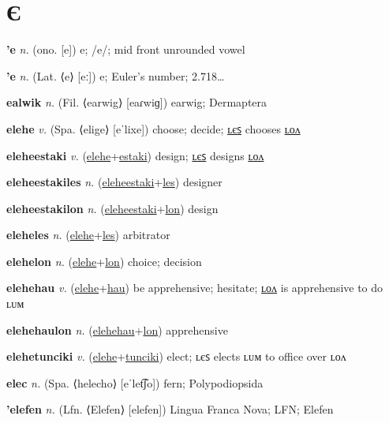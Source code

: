 \section{Є}

\textbf{\hypertarget{'e}{'e}} \textit{n.} (ono. [e])
e; /e/; mid front unrounded vowel

\textbf{\hypertarget{'e}{'e}} \textit{n.} (Lat. ⟨e⟩ [eː])
e; Euler’s number; 2.718…

\textbf{\hypertarget{ealwik}{ealwik}} \textit{n.} (Fil. ⟨earwig⟩ [eaɾwiɡ])
earwig; Dermaptera

\textbf{\hypertarget{elehe}{elehe}} \textit{v.} (Spa. ⟨elige⟩ [eˈlixe])
choose; decide; \hyperlink{eleheles}{ʟєꜱ} chooses \hyperlink{elehelon}{ʟᴏᴧ}

\textbf{\hypertarget{eleheestaki}{eleheestaki}} \textit{v.} (\hyperlink{elehe}{elehe}+\allowbreak \hyperlink{estaki}{estaki})
design; \hyperlink{eleheestakiles}{ʟєꜱ} designs \hyperlink{eleheestakilon}{ʟᴏᴧ}

\textbf{\hypertarget{eleheestakiles}{eleheestakiles}} \textit{n.} (\hyperlink{eleheestaki}{eleheestaki}+\allowbreak \hyperlink{les}{les})
designer

\textbf{\hypertarget{eleheestakilon}{eleheestakilon}} \textit{n.} (\hyperlink{eleheestaki}{eleheestaki}+\allowbreak \hyperlink{lon}{lon})
design

\textbf{\hypertarget{eleheles}{eleheles}} \textit{n.} (\hyperlink{elehe}{elehe}+\allowbreak \hyperlink{les}{les})
arbitrator

\textbf{\hypertarget{elehelon}{elehelon}} \textit{n.} (\hyperlink{elehe}{elehe}+\allowbreak \hyperlink{lon}{lon})
choice; decision

\textbf{\hypertarget{elehehau}{elehehau}} \textit{v.} (\hyperlink{elehe}{elehe}+\allowbreak \hyperlink{hau}{hau})
be apprehensive; hesitate; \hyperlink{elehehaulon}{ʟᴏᴧ} is apprehensive to do ʟᴜᴍ

\textbf{\hypertarget{elehehaulon}{elehehaulon}} \textit{n.} (\hyperlink{elehehau}{elehehau}+\allowbreak \hyperlink{lon}{lon})
apprehensive

\textbf{\hypertarget{elehetunciki}{elehetunciki}} \textit{v.} (\hyperlink{elehe}{elehe}+\allowbreak \hyperlink{tunciki}{tunciki})
elect; ʟєꜱ elects ʟᴜᴍ to office over ʟᴏᴧ

\textbf{\hypertarget{elec}{elec}} \textit{n.} (Spa. ⟨helecho⟩ [eˈlet͡ʃo])
fern; Polypodiopsida

\textbf{\hypertarget{'elefen}{'elefen}} \textit{n.} (Lfn. ⟨Elefen⟩ [elefen])
Lingua Franca Nova; LFN; Elefen


